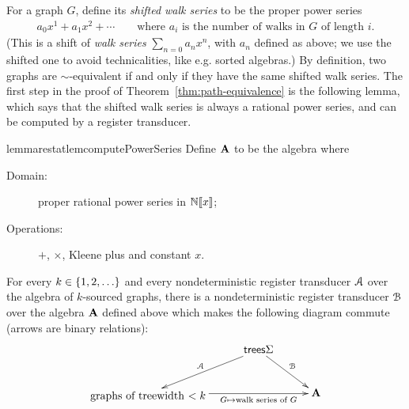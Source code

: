 For a graph $G$, define its \emph{shifted walk series} to be the proper power series 
\begin{align*}
  a_0 x^1 + a_1 x^2 + \cdots \qquad \text{where $a_i$ is the number of walks in $G$ of length $i$.}
\end{align*}
(This is a shift of \emph{walk series} $\sum_{n=0}a_nx^n$, with $a_n$ defined as above; we use the shifted one to avoid technicalities, like e.g. sorted algebras.)
By definition, two graphs are $\sim$-equivalent if and only if they have the same shifted walk series. 
The first step in the proof of Theorem~\ref{thm:path-equivalence} is the following lemma, which says that the shifted walk series is always a rational power series, and can be computed by a register transducer.
\begin{restatable}{lemmarestat}{lemcomputePowerSeries}\label{lem:compute-power-series}    
    Define  $\mathbf{A}$ to be the  algebra where
    \begin{description}
        \item[Domain:] proper rational power series in $\mathbb N [\![x]\!]$;
        \item[Operations:] $+$, $\times$, Kleene plus and constant $x$.
    \end{description}
    For every $k \in \{1,2,\ldots\}$ and every nondeterministic register transducer ${{\mathcal A}}$ over the algebra of $k$-sourced graphs, there is a  nondeterministic register transducer ${\mathcal B}$ over the algebra  $\mathbf{A}$ defined above which makes the following diagram commute (arrows are binary relations):
    \begin{align*}
    \xymatrix@C=1cm{
       &  \trees \Sigma   
        \ar[dr]^{\Bb}
        \ar[dl]_{\Aa} \\
        \txt{graphs of
        treewidth $< k$} \ar[rr]_-{G \mapsto \text{walk series of $G$}}& & \aalg
    }
    \end{align*}
\end{restatable}
